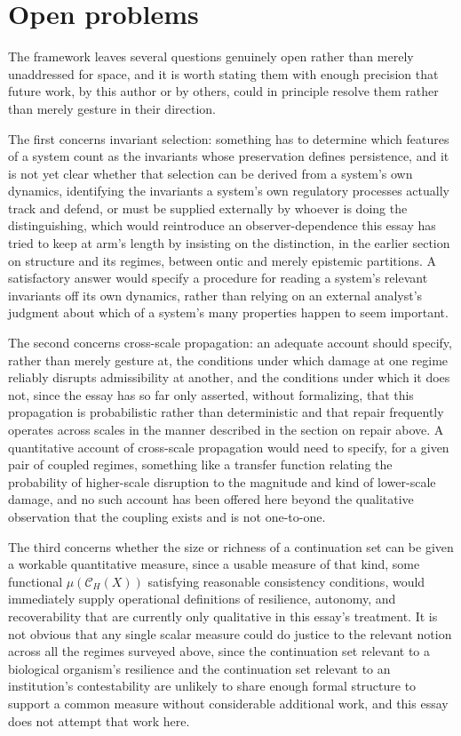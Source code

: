 \documentclass[11pt]{article}
\begin{document}
\section{Open problems}

The framework leaves several questions genuinely open rather than merely unaddressed for space, and it is worth stating them with enough precision that future work, by this author or by others, could in principle resolve them rather than merely gesture in their direction.

The first concerns invariant selection: something has to determine which features of a system count as the invariants whose preservation defines persistence, and it is not yet clear whether that selection can be derived from a system's own dynamics, identifying the invariants a system's own regulatory processes actually track and defend, or must be supplied externally by whoever is doing the distinguishing, which would reintroduce an observer-dependence this essay has tried to keep at arm's length by insisting on the distinction, in the earlier section on structure and its regimes, between ontic and merely epistemic partitions. A satisfactory answer would specify a procedure for reading a system's relevant invariants off its own dynamics, rather than relying on an external analyst's judgment about which of a system's many properties happen to seem important.

The second concerns cross-scale propagation: an adequate account should specify, rather than merely gesture at, the conditions under which damage at one regime reliably disrupts admissibility at another, and the conditions under which it does not, since the essay has so far only asserted, without formalizing, that this propagation is probabilistic rather than deterministic and that repair frequently operates across scales in the manner described in the section on repair above. A quantitative account of cross-scale propagation would need to specify, for a given pair of coupled regimes, something like a transfer function relating the probability of higher-scale disruption to the magnitude and kind of lower-scale damage, and no such account has been offered here beyond the qualitative observation that the coupling exists and is not one-to-one.

The third concerns whether the size or richness of a continuation set can be given a workable quantitative measure, since a usable measure of that kind, some functional $\mu(\mathcal{C}_H(X))$ satisfying reasonable consistency conditions, would immediately supply operational definitions of resilience, autonomy, and recoverability that are currently only qualitative in this essay's treatment. It is not obvious that any single scalar measure could do justice to the relevant notion across all the regimes surveyed above, since the continuation set relevant to a biological organism's resilience and the continuation set relevant to an institution's contestability are unlikely to share enough formal structure to support a common measure without considerable additional work, and this essay does not attempt that work here.
\end{document}

